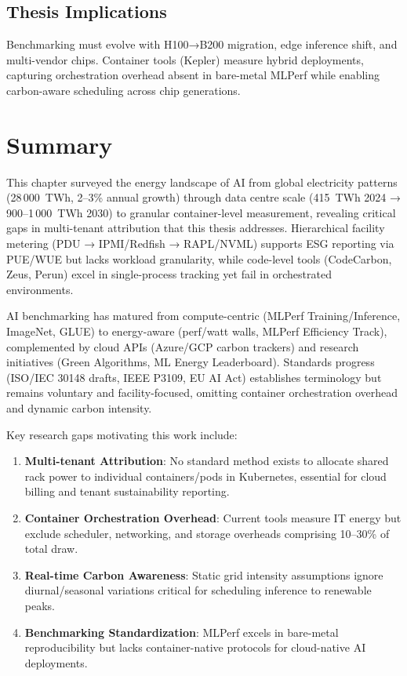 \subsection{Thesis Implications}

Benchmarking must evolve with H100→B200 migration, edge inference shift, and multi-vendor chips. Container tools (Kepler) measure hybrid deployments, capturing orchestration overhead absent in bare-metal MLPerf while enabling carbon-aware scheduling across chip generations.\@

\section{Summary}

This chapter surveyed the energy landscape of AI from global electricity patterns (28\,000~TWh, 2--3\% annual growth) through data centre scale (415~TWh 2024 → 900--1\,000~TWh 2030) to granular container-level measurement, revealing critical gaps in multi-tenant attribution that this thesis addresses. Hierarchical facility metering (PDU → IPMI/Redfish → RAPL/NVML) supports ESG reporting via PUE/WUE but lacks workload granularity, while code-level tools (CodeCarbon, Zeus, Perun) excel in single-process tracking yet fail in orchestrated environments.

AI benchmarking has matured from compute-centric (MLPerf Training/Inference, ImageNet, GLUE) to energy-aware (perf/watt walls, MLPerf Efficiency Track), complemented by cloud APIs (Azure/GCP carbon trackers) and research initiatives (Green Algorithms, ML Energy Leaderboard). Standards progress (ISO/IEC 30148 drafts, IEEE P3109, EU AI Act) establishes terminology but remains voluntary and facility-focused, omitting container orchestration overhead and dynamic carbon intensity.

Key research gaps motivating this work include:
\begin{enumerate}
    \item \textbf{Multi-tenant Attribution}: No standard method exists to allocate shared rack power to individual containers/pods in Kubernetes, essential for cloud billing and tenant sustainability reporting.
    \item \textbf{Container Orchestration Overhead}: Current tools measure IT energy but exclude scheduler, networking, and storage overheads comprising 10--30\% of total draw.
    \item \textbf{Real-time Carbon Awareness}: Static grid intensity assumptions ignore diurnal/seasonal variations critical for scheduling inference to renewable peaks.
    \item \textbf{Benchmarking Standardization}: MLPerf excels in bare-metal reproducibility but lacks container-native protocols for cloud-native AI deployments.
\end{enumerate}

